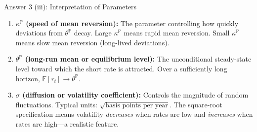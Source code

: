 \documentclass[compress]{beamer}
\begin{document}
\begin{frame}{Answer 3 (iii): Interpretation of Parameters}
    \small
    
    \begin{enumerate}
        \item \textbf{$\kappa^{\mathbb{P}}$ (speed of mean reversion):}
        \vspace{0.3em}
        The parameter controlling how quickly deviations from $\theta^{\mathbb{P}}$ decay. Large $\kappa^{\mathbb{P}}$ means rapid mean reversion. Small $\kappa^{\mathbb{P}}$ means slow mean reversion (long-lived deviations).
        
        \vspace{1em}
        
        \item \textbf{$\theta^{\mathbb{P}}$ (long-run mean or equilibrium level):}
        \vspace{0.3em}
        The unconditional steady-state level toward which the short rate is attracted. Over a sufficiently long horizon, $\mathbb{E}[r_t] \to \theta^{\mathbb{P}}$.
        
        \vspace{1em}
        
        \item \textbf{$\sigma$ (diffusion or volatility coefficient):}
        \vspace{0.3em}
        Controls the magnitude of random fluctuations. Typical units: $\sqrt{\text{basis points per year}}$. The square-root specification means volatility \emph{decreases} when rates are low and \emph{increases} when rates are high—a realistic feature.
        \end{enumerate}
\end{frame}
\end{document}
